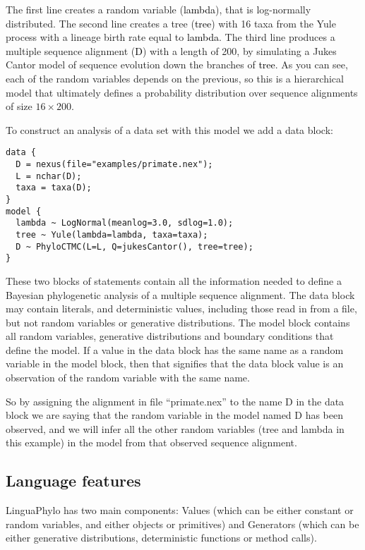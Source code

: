 \documentclass[oneside]{article}
\renewcommand{\texttt}[2][black]{\textcolor{#1}{\ttfamily #2}}%
\begin{document}
The first line creates a random variable (\texttt{lambda}), that is
log-normally distributed.
The second line creates a tree (\texttt{tree}) with 16 taxa from the
Yule process with a lineage birth rate equal to \texttt{lambda}.
The third line produces a multiple sequence alignment (\texttt{D})
with a length of 200, by simulating a Jukes Cantor model of sequence
evolution down the branches of  \texttt{tree}.
As you can see, each of the random variables depends on the previous,
so this is a hierarchical model that ultimately defines a probability
distribution over sequence alignments of size $16 \times 200$.

To construct an analysis of a data set with this model we add a data block:

{\singlespacing
\begin{verbatim}
data {
  D = nexus(file="examples/primate.nex");
  L = nchar(D);
  taxa = taxa(D);
}
model {
  lambda ~ LogNormal(meanlog=3.0, sdlog=1.0);
  tree ~ Yule(lambda=lambda, taxa=taxa);
  D ~ PhyloCTMC(L=L, Q=jukesCantor(), tree=tree);
}
\end{verbatim}
}

These two blocks of statements contain all the information needed to define
a Bayesian phylogenetic analysis of a multiple sequence alignment. 
The data block may contain literals, and deterministic values, including those read in from a file, but not random variables or generative distributions.
The model block contains all random variables, generative distributions and boundary conditions that define the model.
If a value in the data block has the same name as a random variable in the model block, then that signifies that the data block value is an observation of the random variable with the same name.


So by assigning the alignment in file
``primate.nex'' to the name D in the data block we are saying that the random variable in the model named D has 
been observed, and we will infer all the other random variables 
(tree and lambda in this example) in the model from that observed sequence alignment.

\subsection{Language features}

LinguaPhylo has two main components: Values (which can be either constant or random variables, and either objects or primitives) and Generators (which can be either generative distributions, deterministic functions or method calls).
\end{document}
